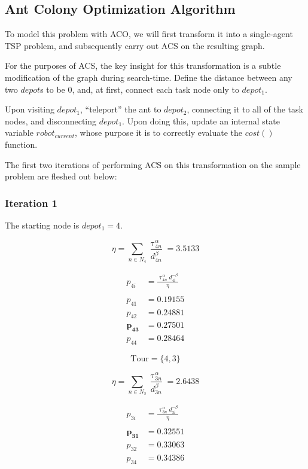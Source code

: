 \documentclass[a4paper]{article}
\begin{document}
\subsection{Ant Colony Optimization Algorithm} %

To model this problem with ACO, we will first transform it into a single-agent TSP problem, and subsequently carry out ACS on the resulting graph.

For the purposes of ACS, the key insight for this transformation is a subtle modification of the graph during search-time. Define the distance between any two $depot$s to be 0, and, at first, connect each task node only to $depot_1$.

Upon visiting $depot_1$, ``teleport'' the ant to $depot_2$, connecting it to all of the task nodes, and disconnecting $depot_1$. Upon doing this, update an internal state variable $robot_{current}$, whose purpose it is to correctly evaluate the $cost()$ function.

The first two iterations of performing ACS on this transformation on the sample problem are fleshed out below:

\subsubsection{Iteration 1}

The starting node is $depot_1 = 4$.

$$
\eta = \sum_{n \in N_4} \frac{\uptau_{4n}^\alpha}{d_{4n}^\beta} = 3.5133
$$

\begin{align*}
p_{4i} &= \frac{\uptau_{4n}^\alpha d_{4i}^{-\beta}}{\eta} \\
\\
p_{41} &= 0.19155 \\
p_{42} &= 0.24881 \\
\mathbf{p_{43}} &= \mathbf{0.27501} \\
p_{44} &= 0.28464
\end{align*}

$$
\text{Tour} = \{4, 3\}
$$


$$
\eta = \sum_{n \in N_3} \frac{\uptau_{3n}^\alpha}{d_{3n}^\beta} = 2.6438
$$

\begin{align*}
p_{3i} &= \frac{\uptau_{3n}^\alpha d_{3i}^{-\beta}}{\eta} \\
\\
\mathbf{p_{31}} &= \mathbf{0.32551} \\
p_{32} &= 0.33063 \\
p_{34} &= 0.34386
\end{align*}
\end{document}
